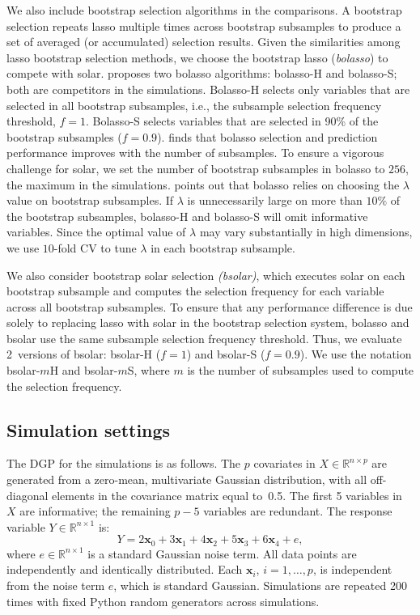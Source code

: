 \documentclass[11pt,review,authoryear]{elsarticle}
\begin{document}
We also include bootstrap selection algorithms in the comparisons. A bootstrap selection repeats lasso multiple times across bootstrap subsamples to produce a set of averaged (or accumulated) selection results. Given the similarities among lasso bootstrap selection methods, we choose the \citet{bach2008bolasso} bootstrap lasso (\emph{bolasso}) to compete with solar. \citet{bach2008bolasso} proposes two bolasso algorithms: bolasso-H and bolasso-S; both are competitors in the simulations. Bolasso-H selects only variables that are selected in all bootstrap subsamples, i.e., the subsample selection frequency threshold, $f=1$. Bolasso-S selects variables that are selected in 90\% of the bootstrap subsamples ($f=0.9$). \citet{bach2008bolasso} finds that bolasso selection and prediction performance improves with the number of subsamples. To ensure a vigorous challenge for solar, we set the number of bootstrap subsamples in bolasso to $256$, the maximum in the \citet{bach2008bolasso} simulations. \citet{meinshausen2010stability} points out that bolasso relies on choosing the $\lambda$ value on bootstrap subsamples. If $\lambda$ is unnecessarily large on more than $10\%$ of the bootstrap subsamples, bolasso-H and bolasso-S will omit informative variables. Since the optimal value of $\lambda$ may vary substantially in high dimensions, we use $10$-fold CV to tune $\lambda$ in each bootstrap subsample.

We also consider bootstrap solar selection \emph{(bsolar)}, which executes solar on each bootstrap subsample and computes the selection frequency for each variable across all bootstrap subsamples. To ensure that any performance difference is due solely to replacing lasso with solar in the bootstrap selection system, bolasso and bsolar use the same subsample selection frequency threshold. Thus, we evaluate 2~versions of bsolar: bsolar-H ($f=1$) and bsolar-S ($f=0.9$). We use the notation bsolar-$m$H and bsolar-$m$S, where $m$ is the number of subsamples used to compute the selection frequency.

\subsection{Simulation settings}

The DGP for the simulations is as follows. The $p$ covariates in $X \in \mathbb{R}^{n \times p}$ are generated from a zero-mean, multivariate Gaussian distribution, with all off-diagonal elements in the covariance matrix equal to~0.5. The first 5 variables in $X$ are informative; the remaining $p-5$ variables are redundant. The response variable $Y \in \mathbb{R}^{n \times 1}$ is:
%
\begin{equation}
%
  Y =  2 \mathbf{x}_0 + 3 \mathbf{x}_1 + 4 \mathbf{x}_2 + 5 \mathbf{x}_3 + 6 \mathbf{x}_4  + e,
  \label{eqn:pop_model}
\end{equation}
%
where $e\in \mathbb{R}^{n \times 1}$ is a standard Gaussian noise term. All data points are independently and identically distributed. Each $\mathbf{x}_i$, $i=1,\ldots,p$, is independent from the noise term $e$, which is standard Gaussian. Simulations are repeated 200 times with fixed Python random generators across simulations.
\end{document}
